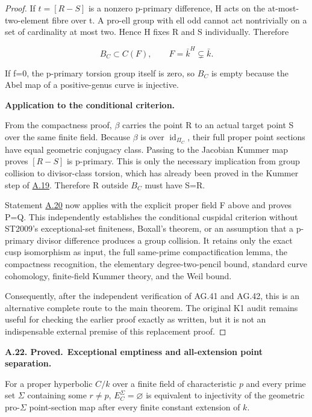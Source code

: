 \documentclass[11pt,a4paper]{article}
\newenvironment{claim}[3]{\par\medskip\noindent\hypertarget{#1}{\textbf{#1. #2.}}\ \textbf{#3.}\par\nopagebreak\smallskip\begingroup\itshape}{\endgroup\par\smallskip}
\newcommand{\statementref}[1]{\hyperlink{#1}{#1}}
\begin{document}
\begin{proof}
If \(t=[R-S]\) is a nonzero p-primary difference, H acts on the at-most-two-element fibre over t. A pro-ell group with ell odd cannot act nontrivially on a set of cardinality at most two. Hence H fixes R and S individually. Therefore

\[B_C\subset C(F),\qquad F=\bar k^H\subsetneq\bar k.\]

If f=0, the p-primary torsion group itself is zero, so \(B_C\) is empty because the Abel map of a positive-genus curve is injective.

\textbf{Application to the conditional criterion.}

From the compactness proof, \({\beta}\) carries the point R to an actual target point S over the same finite field. Because \({\beta}\) is over \(\operatorname{id}_{{\Pi}_C}\), their full proper point sections have equal geometric conjugacy class. Passing to the Jacobian Kummer map proves \([R-S]\) is p-primary. This is only the necessary implication from group collision to divisor-class torsion, which has already been proved in the Kummer step of \statementref{A.19}. Therefore R outside \(B_C\) must have S=R.

Statement \statementref{A.20} now applies with the explicit proper field F above and proves P=Q. This independently establishes the conditional cuspidal criterion without ST2009's exceptional-set finiteness, Boxall's theorem, or an assumption that a p-primary divisor difference produces a group collision. It retains only the exact cusp isomorphism as input, the full same-prime compactification lemma, the compactness recognition, the elementary degree-two-pencil bound, standard curve cohomology, finite-field Kummer theory, and the Weil bound.

Consequently, after the independent verification of AG.41 and AG.42, this is an alternative complete route to the main theorem. The original K1 audit remains useful for checking the earlier proof exactly as written, but it is not an indispensable external premise of this replacement proof.


\end{proof}

\begin{claim}{A.22}{Proved}{Exceptional emptiness and all-extension point separation}

For a proper hyperbolic $C/k$ over a finite field of characteristic
$p$ and every prime set $\Sigma$ containing some $r\ne p$,
$E_C^\Sigma=\varnothing$ is equivalent to injectivity of the
geometric pro-$\Sigma$ point-section map after every finite
constant extension of $k$.

\end{claim}
\end{document}
